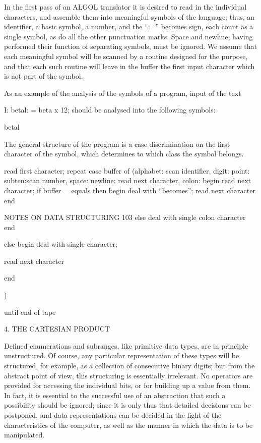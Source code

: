 In the first pass of an ALGOL translator it is desired to read in the individual characters, and assemble them into meaningful symbols of the language; thus, an identifier, a basic symbol, a number, and the “:=” becomes sign, each count as a single symbol, as do all the other punctuation marks. Space and newline, having performed their function of separating symbols, must be ignored. We assume that each meaningful symbol will be scanned by a routine designed for the purpose, and that each such routine will leave in the buffer the first input character which is not part of the symbol.

As an example of the analysis of the symbols of a program, input of the text

I: betal: = beta x 12; should be analysed into the following symbols:

betal

The general structure of the program is a case discrimination on the first character of the symbol, which determines to which class the symbol belongs.

read first character; repeat case buffer of (alphabet: scan identifier, digit: point: subten:scan number, space: newline: read next character, colon: begin read next character; if buffer = equals then begin deal with “becomes”; read next character end

NOTES ON DATA STRUCTURING 103 else deal with single colon character end

else begin deal with single character;

read next character

end

)

until end of tape

4. THE CARTESIAN PRODUCT

Defined enumerations and subranges, like primitive data types, are in principle unstructured. Of course, any particular representation of these types will be structured, for example, as a collection of consecutive binary digits; but from the abstract point of view, this structuring is essentially irrelevant. No operators are provided for accessing the individual bits, or for building up a value from them. In fact, it is essential to the successful use of an abstraction that such a possibility should be ignored; since it is only thus that detailed decisions can be postponed, and data representations can be decided in the light of the characteristics of the computer, as well as the manner in which the data is to be manipulated.

